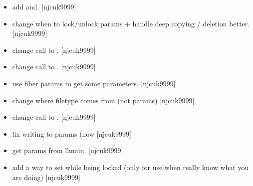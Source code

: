 \documentclass[a4paper,10pt,english]{report}
\begin{document}
\begin{itemize}
\item {} 
 \sphinxhyphen{} add  and.
{[}njcuk9999{]}

\item {} 
 \sphinxhyphen{} change when to lock/unlock
params + handle deep copying / deletion better. {[}njcuk9999{]}

\item {} 
 \sphinxhyphen{} change call to . {[}njcuk9999{]}

\item {} 
 \sphinxhyphen{} change call to . {[}njcuk9999{]}

\item {} 
 \sphinxhyphen{} use fiber params to get some
parameters. {[}njcuk9999{]}

\item {} 
 \sphinxhyphen{} change where filetype comes from (not params)
{[}njcuk9999{]}

\item {} 
 \sphinxhyphen{} change call to . {[}njcuk9999{]}

\item {} 
 \sphinxhyphen{} fix writing to params (now
 {[}njcuk9999{]}

\item {} 
 \sphinxhyphen{} get params from llmain. {[}njcuk9999{]}

\item {} 
 \sphinxhyphen{} add a way to set while being locked (only for use
when really know what you are doing) {[}njcuk9999{]}

\end{itemize}
\end{document}
